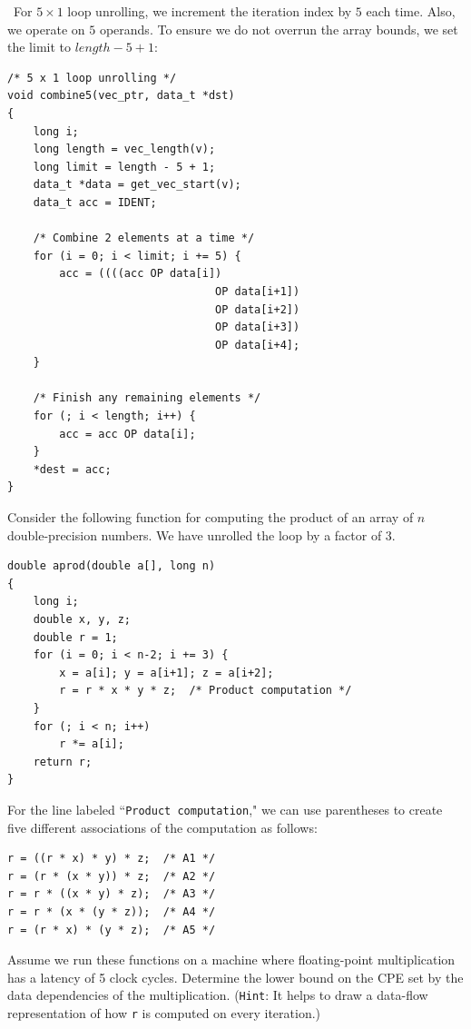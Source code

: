 \documentclass[12pt]{article}
\newenvironment{ex}[2][Exercise]{\begin{trivlist}
		\item[\hskip \labelsep {\bfseries #1}\hskip \labelsep {\bfseries #2.}]}{\end{trivlist}}
\newenvironment{sol}[1][Solution]{\begin{trivlist}
		\item[\hskip \labelsep {\bfseries #1:}]}{\end{trivlist}}
\begin{document}
\begin{sol}
	\
	For $5\times 1$ loop unrolling, we increment the iteration index by $5$ each time.
	Also, we operate on $5$ operands. To ensure we do not overrun the array bounds, we
	set the limit to $length - 5 + 1$: 
	\begin{lstlisting}
/* 5 x 1 loop unrolling */
void combine5(vec_ptr, data_t *dst)
{
	long i;
	long length = vec_length(v);
	long limit = length - 5 + 1;
	data_t *data = get_vec_start(v);
	data_t acc = IDENT;
	
	/* Combine 2 elements at a time */
	for (i = 0; i < limit; i += 5) {
		acc = ((((acc OP data[i])
								OP data[i+1])
								OP data[i+2])
								OP data[i+3]) 
								OP data[i+4];
	}

	/* Finish any remaining elements */
	for (; i < length; i++) {
		acc = acc OP data[i];
	}
	*dest = acc;
}
	\end{lstlisting}
\end{sol}

\begin{ex}{5.8}
	Consider the following function for computing the product of an array of $n$ double-precision
	numbers. We have unrolled the loop by a factor of $3$.
	\begin{lstlisting}
double aprod(double a[], long n)
{
	long i;
	double x, y, z;
	double r = 1;
	for (i = 0; i < n-2; i += 3) {
		x = a[i]; y = a[i+1]; z = a[i+2];
		r = r * x * y * z;	/* Product computation */
	}
	for (; i < n; i++)
		r *= a[i];
	return r;
}
	\end{lstlisting}
	For the line labeled ``\texttt{Product computation}," we can use parentheses to create five
	different associations of the computation as follows:
	\begin{lstlisting}
r = ((r * x) * y) * z;	/* A1 */
r = (r * (x * y)) * z;	/* A2 */
r = r * ((x * y) * z);	/* A3 */
r = r * (x * (y * z));	/* A4 */
r = (r * x) * (y * z);	/* A5 */
	\end{lstlisting}
	Assume we run these functions on a machine where floating-point multiplication has a
	latency of 5 clock cycles. Determine the lower bound on the CPE set by the data
	dependencies of the multiplication. (\texttt{Hint}: It helps to draw a data-flow
	representation of how \texttt{r} is computed on every iteration.)
\end{ex}
\end{document}
